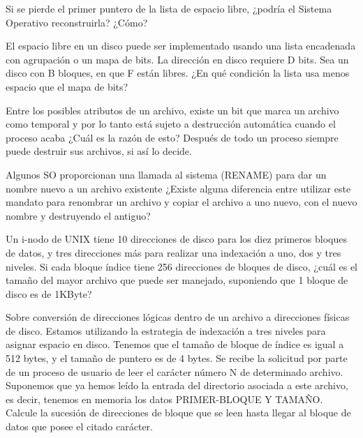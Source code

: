 \begin{ejercicio}
Si se pierde el primer puntero de la lista de espacio libre, ¿podría el Sistema Operativo reconstruirla? ¿Cómo?
\end{ejercicio}

\begin{ejercicio}
El espacio libre en un disco puede ser implementado usando una lista encadenada con agrupación o un mapa de bits. La dirección en disco requiere D bits. Sea un disco con B bloques, en que F están libres. ¿En qué condición la lista usa menos espacio que el mapa de bits?
\end{ejercicio}

\begin{ejercicio}
Entre los posibles atributos de un archivo, existe un bit que marca un archivo como temporal y por lo tanto está sujeto a destrucción automática cuando el proceso acaba ¿Cuál es la razón de esto? Después de todo un proceso siempre puede destruir sus archivos, si así lo decide.
\end{ejercicio}

\begin{ejercicio}
Algunos SO proporcionan una llamada al sistema (RENAME) para dar un nombre nuevo a un archivo existente ¿Existe alguna diferencia entre utilizar este mandato para renombrar un archivo y copiar el archivo a uno nuevo, con el nuevo nombre y destruyendo el antiguo?
\end{ejercicio}

\begin{ejercicio}
Un i-nodo de UNIX tiene 10 direcciones de disco para los diez primeros bloques de datos, y tres direcciones más para realizar una indexación a uno, dos y tres niveles. Si cada bloque índice tiene 256 direcciones de bloques de disco, ¿cuál es el tamaño del mayor archivo que puede ser manejado, suponiendo que 1 bloque de disco es de 1KByte?
\end{ejercicio}

\begin{ejercicio}
Sobre conversión de direcciones lógicas dentro de un archivo a direcciones físicas de disco. Estamos utilizando la estrategia de indexación a tres niveles para asignar espacio en disco. Tenemos que el tamaño de bloque de índice es igual a 512 bytes, y el tamaño de puntero es de 4 bytes. Se recibe la solicitud por parte de un proceso de usuario de leer el carácter número N de determinado archivo. Suponemos que ya hemos leído la entrada del directorio asociada a este archivo, es decir, tenemos en memoria los datos PRIMER-BLOQUE Y TAMAÑO. Calcule la sucesión de direcciones de bloque que se leen hasta llegar al bloque de datos que posee el citado carácter.
\end{ejercicio}

